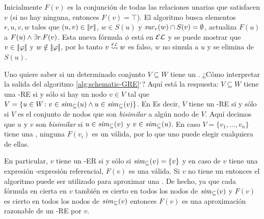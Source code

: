 Inicialmente $F(v)$ es la conjunci\'on de todas las relaciones unarias que
satisfacen $v$ (si no hay ninguna, entonces $F(v)=\top$).
El algoritmo busca elementos $r,u,v,w$ tales que
$(u,v)\in|\!|r|\!|$, $w\in S(u)$ y ${\it suc}_{r}(w)\cap
S(v)=\emptyset$, actualiza $F(u)$ a $F(u)\wedge\exists r. F(v)$.
Esta nueva f\'ormula $\phi$ est\'a en $\mathcal{EL}$ y se puede mostrar que
$v\in|\!|\varphi|\!|$ y $w\notin|\!|\varphi|\!|$, por lo tanto $v\simil{\EL} w$ es falso, $w$ no simula a $u$ y se elimina de $S(u)$.

\iffullversion Uno quiere saber si un determinado conjunto  $V\subseteq W$
tiene un \posre. ¿C\'omo interpretar la salida del algoritmo
\ref{alg:schematic-GRE}`? Aqu\'i est\'a la respuesta: $V\subseteq W$ tiene una
\EL-RE si y s\'olo si hay un nodo $v\in V$ tal que  $V=\{u\in W\colon
v\in{\it sim}_\subseteq(u) \wedge u\in{\it sim}_\subseteq(v)\}$. En
Es decir, $V$ tiene un \EL-RE si y s\'olo si $V$ es el conjunto de nodos que son
\emph{bisimilar} a alg\'un nodo de $V$. Aqu\'i decimos que $u$ y $v$
son \emph{bisimilar} si $u\in{\it sim}_\subseteq(v)$ y
$v\in{\it sim}_\subseteq(u)$. En caso  $V=\{v_1,\dots,v_n\}$ tiene una
\posre, ninguna $F(v_i)$ es un \posre v\'alida, por lo que uno puede elegir cualquiera de ellas.

En particular, $v$ tiene un \EL-ER si y s\'olo si ${\it sim}_\subseteq(v)=\{v\}$
y en caso de $v$ tiene una expresi\'on \EL-expresi\'on referencial, $F(v)$ es una v\'alida. Si $v$ no tiene un \posre entonces el algoritmo puede ser
utilizado para aproximar una \posre. De hecho, ya que cada f\'ormula en cierta en $v$
tambi\'en es cierto en todos los nodos de ${\it sim}_\subseteq(v)$ y $F(v)$
es cierto en todos los nodos de ${\it sim}_\subseteq(v)$ entonces $F(v)$ es una
aproximaci\'on razonable de un \EL-RE por $v$.

